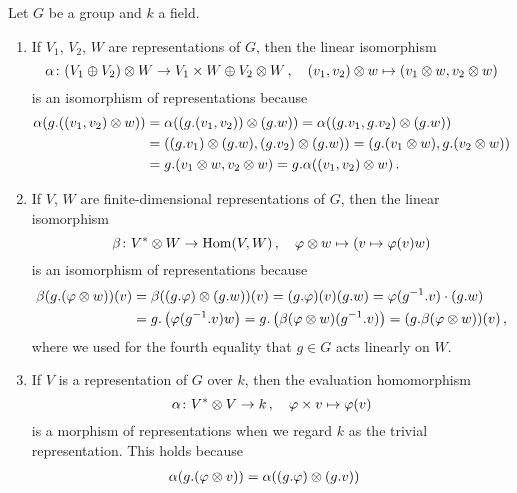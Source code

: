 \begin{example}
  Let $G$ be a group and $k$ a field.
  \begin{enumerate}
    \item
      If $V_1$, $V_2$, $W$ are representations of $G$, then the linear isomorphism
      \[
                \alpha
        \colon  (V_1 \oplus V_2) \mathbin{\otimes} W
        \to     V_1 \times W \oplus V_2 \mathbin{\otimes} W \,,
        \quad   (v_1, v_2) \mathbin{\otimes} w
        \mapsto (v_1 \mathbin{\otimes} w, v_2 \mathbin{\otimes} w)
      \]
      is an isomorphism of representations because
      \begin{align*}
            \alpha( g . ((v_1,v_2) \mathbin{\otimes} w) )
        &=  \alpha( (g.(v_1, v_2)) \mathbin{\otimes} (g.w) )
         =  \alpha( (g.v_1, g.v_2) \mathbin{\otimes} (g.w) )
        \\
        &=  ( (g.v_1) \mathbin{\otimes} (g.w) , (g.v_2) \mathbin{\otimes} (g.w) )
         =  ( g.(v_1 \mathbin{\otimes} w), g.(v_2 \mathbin{\otimes} w) )
        \\
        &=  g.(v_1 \mathbin{\otimes} w, v_2 \mathbin{\otimes} w)
         =  g.\alpha((v_1, v_2) \mathbin{\otimes} w) \,.
      \end{align*}
    \item
      If $V$, $W$ are finite-dimensional representations of $G$, then the linear isomorphism
      \[
                \beta
        \colon  V^* \mathbin{\otimes} W
        \to     \operatorname{Hom}(V,W) \,,
        \quad   \varphi \mathbin{\otimes} w
        \mapsto (v \mapsto \varphi(v) w)
      \]
      is an isomorphism of representations because
      \begin{align*}
            \beta( g.(\varphi \mathbin{\otimes} w) )(v)
        &=  \beta( (g.\varphi) \mathbin{\otimes} (g.w) )(v)
         =  (g.\varphi)(v) (g.w)
         =  \varphi(g^{-1}.v) \cdot (g.w)
        \\
        &=  g.\left( \varphi(g^{-1}.v) w \right)
         =  g.\left( \beta(\varphi \mathbin{\otimes} w)(g^{-1}.v) \right)
         =  (g.\beta(\varphi \mathbin{\otimes} w))(v) \,,
      \end{align*}
      where we used for the fourth equality that $g \in G$ acts linearly on $W$.
    \item
      If $V$ is a representation of $G$ over $k$, then the evaluation homomorphism
      \[
                \alpha
        \colon  V^* \mathbin{\otimes} V
        \to     k \,,
        \quad   \varphi \times v
        \mapsto \varphi(v)
      \]
      is a morphism of representations when we regard $k$ as the trivial representation.
      This holds because
      \begin{align*}
            \alpha(g.(\varphi \tensor v))
        &=  \alpha((g.\varphi) \tensor (g.v))

\end{align*}
\end{enumerate}
\end{example}
